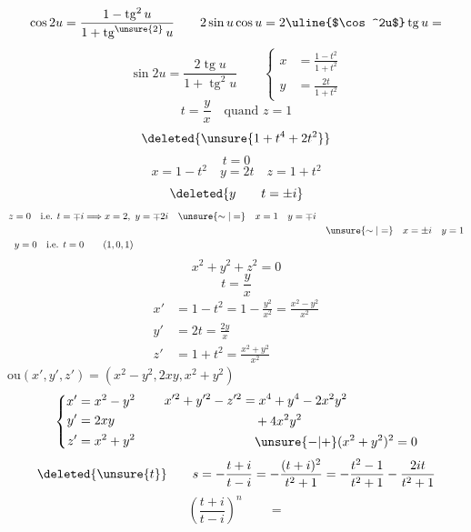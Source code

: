 \[
\cos 2u=\frac{1-\operatorname{tg}^{2}u}{1+\operatorname{tg}^{\unsure{2}}u}
\qquad 2\sin u\cos u=2\text{\uline{$\cos^2u$}}\operatorname{tg}u=
\]
\[
\sin 2u=\frac{2\operatorname{tg}u}{1+\operatorname{tg}^2u}
\qquad
\left\{\begin{aligned}x&=\frac{1-t^2}{1+t^2}\\y&=\frac{2t}{1+t^2}\end{aligned}\right.
\]
\[
t=\frac yx\quad\text{quand }z=1
\]
\[
\deleted{\unsure{1+t^4+2t^2}}
\]
\[
t=0
\]
\[
x=1-t^2\quad y=2t\quad z=1+t^2
\]
\[
\deleted{y\qquad t=\pm i}
\]
\[
\begin{aligned}
z=0\quad\text{i.e. }t=\mp i&\Longrightarrow x=2,\ y=\mp2i\quad
\unsure{\sim|=}\quad x=1\quad y=\mp i\\
&&\unsure{\sim|=}\quad x=\pm i\quad y=1\\
y=0\quad\text{i.e. }t=0&\qquad(1,0,1)
\end{aligned}
\]
\[
x^2+y^2+z^2=0
\]
\[
t=\frac yx
\]
\[
\begin{aligned}
x'&=1-t^2=1-\frac{y^2}{x^2}=\frac{x^2-y^2}{x^2}\\
y'&=2t=\frac{2y}{x}\\
z'&=1+t^2=\frac{x^2+y^2}{x^2}
\end{aligned}
\]
ou\quad $(x',y',z')=(x^2-y^2,2xy,x^2+y^2)$
\[
\left\{\begin{aligned}x'&=x^2-y^2\\y'&=2xy\\z'&=x^2+y^2\end{aligned}\right.
\qquad
\begin{aligned}
x'^2+y'^2-z'^2&=x^4+y^4-2x^2y^2\\
&\quad+4x^2y^2\\
&\quad\unsure{-|+}(x^2+y^2)^2=0
\end{aligned}
\]
\[
\deleted{\unsure{t}}\qquad
s=-\frac{t+i}{t-i}=-\frac{(t+i)^2}{t^2+1}
=-\frac{t^2-1}{t^2+1}-\frac{2it}{t^2+1}
\]
\[
\left(\frac{t+i}{t-i}\right)^n\qquad=
\]
